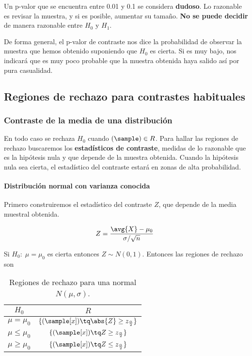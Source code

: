 \documentclass{apuntes}
\begin{document}
Un p-valor que se encuentra entre 0.01 y 0.1 se considera \textbf{dudoso}. Lo razonable es revisar la muestra, y si es posible, aumentar su tamaño. \textbf{No se puede decidir} de manera razonable entre $H_0$ y $H_1$.

De forma general, el p-valor de contraste nos dice la probabilidad de observar la muestra que hemos obtenido suponiendo que $H_0$ es cierta. Si es muy bajo, nos indicará que es muy poco probable que la muestra obtenida haya salido así por pura casualidad.

\pagebreak
\subsection{Regiones de rechazo para contrastes habituales}
\subsubsection{Contraste de la media de una distribución}

En todo caso se rechaza $H_0$ cuando $(\sample) \in R$. Para hallar las regiones de rechazo buscaremos los \textbf{estadísticos de contraste}, medidas de lo razonable que es la hipótesis nula y que depende de la muestra obtenida. Cuando la hipótesis nula sea cierta, el estadístico del contraste estará en zonas de alta probabilidad.

\paragraph{Distribución normal con varianza conocida}

Primero construiremos el estadístico del contraste $Z$, que depende de la media muestral obtenida.

\[ Z = \frac{\avg{X}-\mu_0}{\sigma/\sqrt{n}} \]

Si $H_0:\;\mu=\mu_0$ es cierta entonces $Z\sim N(0,1)$. Entonces las regiones de rechazo son

\begin{table}[hbtp]
\centering
\begin{tabular}{|c|c|}
\hline  $H_0$ & $R$  \\
\hline  $\mu=\mu_0$ & $\{ (\sample[x]) \tq \abs{Z} \geq z_{\frac{\alpha}{2}}\}$ \\
\hline  $\mu\leq\mu_0$ & $\{ (\sample[x]) \tq Z \geq z_{\frac{\alpha}{2}}\}$ \\
\hline  $\mu\geq\mu_0$ & $\{  (\sample[x]) \tq Z \leq z_{\frac{\alpha}{2}}\}$ \\
\hline
\end{tabular}
\caption{Regiones de rechazo para una normal $N(\mu,\sigma)$.}
\end{table}
\end{document}
